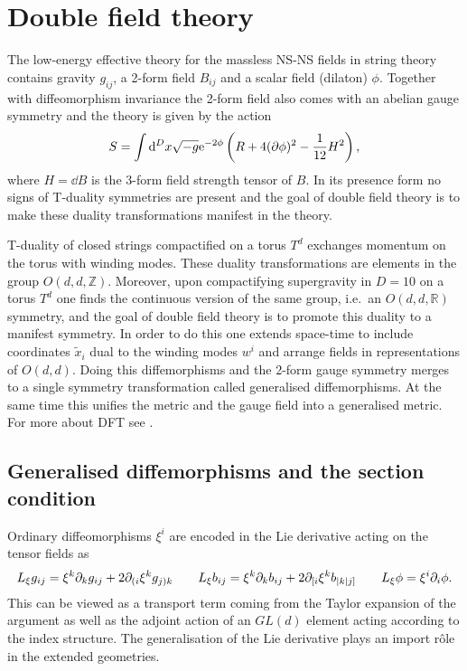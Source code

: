 \chapter{Double field theory}\label{sec:DFT}
The low-energy effective theory for the massless NS-NS fields in string theory contains gravity $g_{ij}$, a 2-form field $B_{ij}$ and a scalar field (dilaton) $\phi$. Together with diffeomorphism invariance the 2-form field also comes with an abelian gauge symmetry and the theory is given by the action 
\begin{equation}
    S = \int \mathrm{d} ^Dx \sqrt{-g}\mathrm{e}^{-2\phi}\left(R+4(\partial\phi)^2-\frac{1}{12}H^2\right),
\end{equation}
where $H=\dd B$ is the 3-form field strength tensor of $B$. In its presence form no signs of T-duality symmetries are present and the goal of double field theory is to make these duality transformations manifest in the theory.

T-duality of closed strings compactified on a torus $T^d$ exchanges momentum on the torus with winding modes. These duality transformations are elements in the group $O(d,d,\mathbb{Z})$. Moreover, upon compactifying supergravity in $D=10$ on a torus $T^d$ one finds the continuous version of the same group, i.e.\ an $O(d,d,\mathbb{R})$ symmetry, and the goal of double field theory is to promote this duality to a manifest symmetry. In order to do this one extends space-time to include coordinates $\tilde{x}_i$ dual to the winding modes $w^i$ and arrange fields in representations of $O(d,d)$. Doing this diffemorphisms and the 2-form gauge symmetry merges to a single symmetry transformation called generalised diffemorphisms. At the same time this unifies the metric and the gauge field into a generalised metric. For more about DFT see \cite{Berman2014,HohmZwiebach2013,DFTHullZwiebach2009,DFTAldazabal2013}. 


\section{Generalised diffemorphisms and the section condition}
Ordinary diffeomorphisms $\xi^i$ are encoded in the Lie derivative acting on the tensor fields as 
\begin{equation}
    L_\xi g_{ij} = \xi^k\partial_kg_{ij}+2\partial_{(i}\xi^kg_{j)k} \qquad L_\xi b_{ij} = \xi^k\partial_k b_{ij} + 2 \partial_{[i}\xi^k b_{|k|j]} \qquad L_\xi \phi = \xi^i\partial_i\phi. 
\end{equation}
This can be viewed as a transport term coming from the Taylor expansion of the argument as well as the adjoint action of an $GL(d)$ element acting according to the index structure. The generalisation of the Lie derivative plays an import rôle in the extended geometries. 

